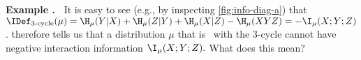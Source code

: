     \label{example:nonneg-ii}
\textbf{Example \theexample.~}
It is easy to see 
(e.g., by inspecting \cref{fig:info-diag-a}) 
that
$\IDef_{\text{3-cycle}}(\mu) = 
    \H_\mu(Y|X) + \H_\mu(Z|Y) + \H_\mu(X|Z) - \H_\mu(XYZ)
    =
    -\I_\mu(X;Y;Z)$.
%
%
 therefore tells us that 
a
distribution
    $\mu$ that is \scible\ 
    with the 3-cycle 
    cannot have negative interaction information
$
    \I_\mu(X; Y; Z)
        . 
$
What does this mean?
